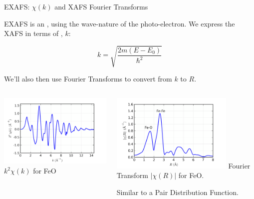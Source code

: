 
\begin{slide}{EXAFS: $\chi(k)$ and XAFS Fourier Transforms}

  \begin{cenpage}{140mm}

    EXAFS is an {}, using the wave-nature of
    the photo-electron.  We express the XAFS in terms of
    {}, ${k}$:

    \[  k= \sqrt{  \frac{2m(E-E_0)}{ {\hbar}^2} } \]

We'll also then use Fourier Transforms to convert from $k$ to  $R$.
\vmm



   \begin{columns}[T]
     \begin{column}{65mm}
       \includegraphics[width=58mm]{figs/rimg/feo_chik}
       \hspace{10mm} $k^2\chi(k)$ for FeO       
     \end{column}
     \begin{column}{65mm}
       \includegraphics[width=58mm]{figs/rimg/feo_chir}
       \hspace{10mm}   Fourier Transform $|\chi(R)|$ for FeO. \par
       Similar to a Pair Distribution Function.
       
     \end{column}     
   \end{columns}


\end{cenpage}

\end{slide}
